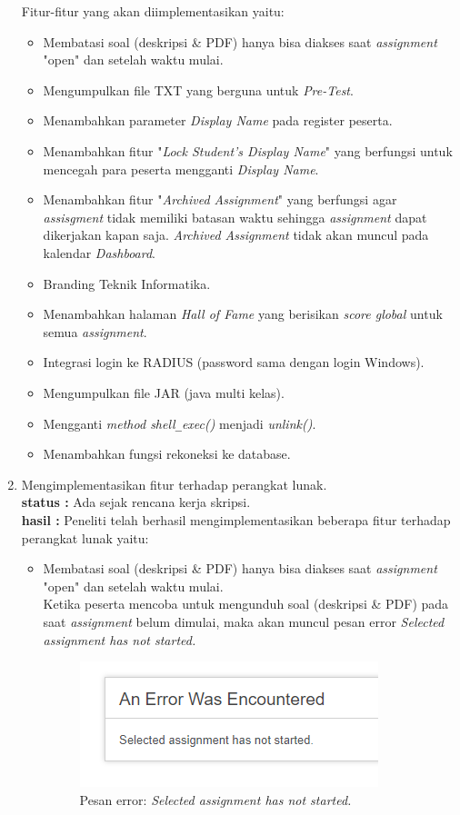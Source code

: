 \documentclass[a4paper,twoside]{article}
\begin{document}
\begin{enumerate}
		\pagebreak
		Fitur-fitur yang akan diimplementasikan yaitu:
		\begin{itemize}
			\item Membatasi soal (deskripsi \& PDF) hanya bisa diakses saat \textit{assignment} "open" dan setelah waktu mulai.
			\item Mengumpulkan file TXT yang berguna untuk \textit{Pre-Test}.
			\item Menambahkan parameter \textit{Display Name} pada register peserta.
			\item Menambahkan fitur "\textit{Lock Student's Display Name}" yang berfungsi untuk mencegah para peserta mengganti \textit{Display Name}.
			\item Menambahkan fitur "\textit{Archived Assignment}" yang berfungsi agar \textit{assisgment} tidak memiliki batasan waktu sehingga \textit{assignment} dapat dikerjakan kapan saja. \textit{Archived Assignment} tidak akan muncul pada kalendar \textit{Dashboard}.
			\item Branding Teknik Informatika.
			\item Menambahkan halaman\textit{ Hall of Fame} yang berisikan \textit{score global} untuk semua \textit{assignment}.
			\item Integrasi login ke RADIUS (password sama dengan login Windows).
			\item Mengumpulkan file JAR (java multi kelas).
			\item Mengganti \textit{method shell\texttt{\_}exec()} menjadi \textit{unlink()}.
			\item Menambahkan fungsi rekoneksi ke database.
		\end{itemize}
		
		\item Mengimplementasikan fitur terhadap perangkat lunak.\\
		{\bf status :} Ada sejak rencana kerja skripsi.\\
		{\bf hasil :} Peneliti telah berhasil mengimplementasikan beberapa fitur terhadap perangkat lunak yaitu:
		\begin{itemize}
			\item Membatasi soal (deskripsi \& PDF) hanya bisa diakses saat \textit{assignment} "open" dan setelah waktu mulai. \\
			Ketika peserta mencoba untuk mengunduh soal (deskripsi \& PDF) pada saat \textit{assignment} belum dimulai, maka akan muncul pesan error \textit{Selected \textit{assignment} has not started.}
			\begin{figure}[H]
				\centering  
				\includegraphics[scale=0.8]{not_started}  
				\caption[Pesan error: \textit{Selected assignment has not started.}]{Pesan error: \textit{Selected assignment has not started.}} 
				\label{fig:notstarted} 
			\end{figure} 
		

\end{itemize}
\end{enumerate}
\end{document}
